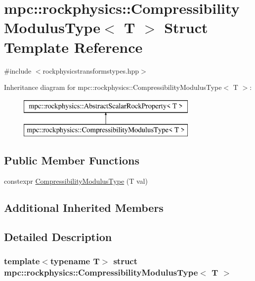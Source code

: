 \hypertarget{structmpc_1_1rockphysics_1_1_compressibility_modulus_type}{}\section{mpc\+:\+:rockphysics\+:\+:Compressibility\+Modulus\+Type$<$ T $>$ Struct Template Reference}
\label{structmpc_1_1rockphysics_1_1_compressibility_modulus_type}


{\ttfamily \#include $<$rockphysicstransformstypes.\+hpp$>$}

Inheritance diagram for mpc\+:\+:rockphysics\+:\+:Compressibility\+Modulus\+Type$<$ T $>$\+:\begin{figure}[H]
\begin{center}
\leavevmode
\includegraphics[height=2.000000cm]{structmpc_1_1rockphysics_1_1_compressibility_modulus_type}
\end{center}
\end{figure}
\subsection*{Public Member Functions}
\begin{DoxyCompactItemize}
\item 
constexpr \mbox{\hyperlink{structmpc_1_1rockphysics_1_1_compressibility_modulus_type_a7a8f465566c3f05f6bd9f24491680768}{Compressibility\+Modulus\+Type}} (T val)
\end{DoxyCompactItemize}
\subsection*{Additional Inherited Members}


\subsection{Detailed Description}
\subsubsection*{template$<$typename T$>$\newline
struct mpc\+::rockphysics\+::\+Compressibility\+Modulus\+Type$<$ T $>$}



